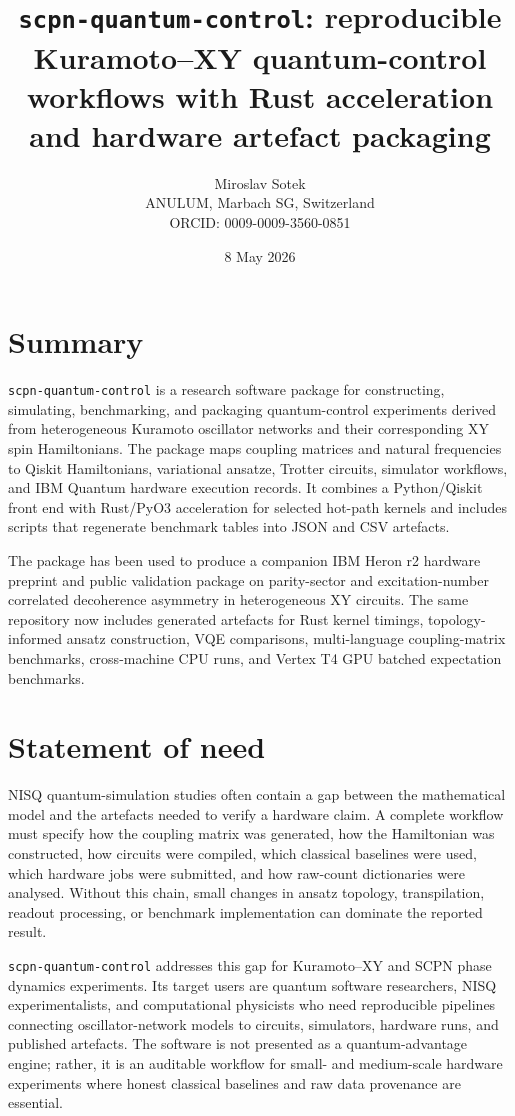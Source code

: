 \documentclass[11pt]{article}
\title{\texttt{scpn-quantum-control}: reproducible Kuramoto--XY quantum-control workflows with Rust acceleration and hardware artefact packaging}
\author{Miroslav Sotek\\ANULUM, Marbach SG, Switzerland\\ORCID: 0009-0009-3560-0851}
\date{8 May 2026}
\begin{document}
\maketitle

\section*{Summary}

\texttt{scpn-quantum-control} is a research software package for constructing,
simulating, benchmarking, and packaging quantum-control experiments derived from
heterogeneous Kuramoto oscillator networks and their corresponding XY spin
Hamiltonians. The package maps coupling matrices and natural frequencies to
Qiskit Hamiltonians, variational ansatze, Trotter circuits, simulator workflows,
and IBM Quantum hardware execution records. It combines a Python/Qiskit front
end with Rust/PyO3 acceleration for selected hot-path kernels and includes
scripts that regenerate benchmark tables into JSON and CSV artefacts.

The package has been used to produce a companion IBM Heron r2 hardware preprint
and public validation package on parity-sector and excitation-number correlated
decoherence asymmetry in heterogeneous XY circuits. The same repository now
includes generated artefacts for Rust kernel timings, topology-informed ansatz
construction, VQE comparisons, multi-language coupling-matrix benchmarks,
cross-machine CPU runs, and Vertex T4 GPU batched expectation benchmarks.

\section*{Statement of need}

NISQ quantum-simulation studies often contain a gap between the mathematical
model and the artefacts needed to verify a hardware claim. A complete workflow
must specify how the coupling matrix was generated, how the Hamiltonian was
constructed, how circuits were compiled, which classical baselines were used,
which hardware jobs were submitted, and how raw-count dictionaries were
analysed. Without this chain, small changes in ansatz topology, transpilation,
readout processing, or benchmark implementation can dominate the reported
result.

\texttt{scpn-quantum-control} addresses this gap for Kuramoto--XY and SCPN phase
dynamics experiments. Its target users are quantum software researchers, NISQ
experimentalists, and computational physicists who need reproducible pipelines
connecting oscillator-network models to circuits, simulators, hardware runs,
and published artefacts. The software is not presented as a quantum-advantage
engine; rather, it is an auditable workflow for small- and medium-scale hardware
experiments where honest classical baselines and raw data provenance are
essential.
\end{document}
